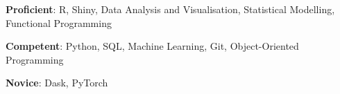 \textbf{Proficient}: R, Shiny, Data Analysis and Visualisation, Statistical Modelling, Functional Programming

\textbf{Competent}: Python, SQL, Machine Learning, Git, Object-Oriented Programming

\textbf{Novice}: Dask, PyTorch